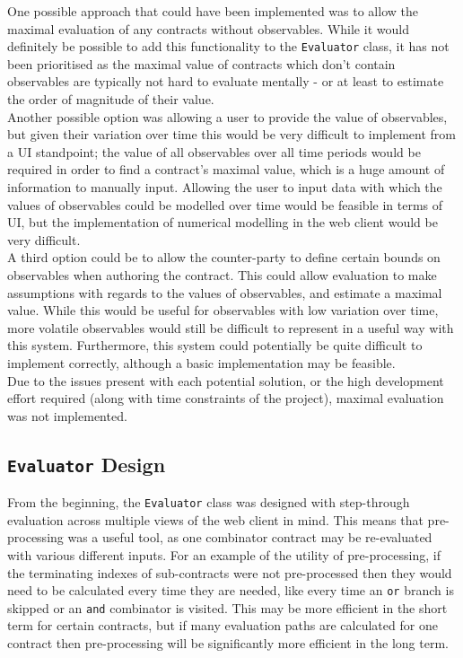One possible approach that could have been implemented was to allow the maximal evaluation of any contracts without observables. While it would definitely be possible to add this functionality to the \texttt{Evaluator} class, it has not been prioritised as the maximal value of contracts which don't contain observables are typically not hard to evaluate mentally - or at least to estimate the order of magnitude of their value. \\

Another possible option was allowing a user to provide the value of observables, but given their variation over time this would be very difficult to implement from a UI standpoint; the value of all observables over all time periods would be required in order to find a contract's maximal value, which is a huge amount of information to manually input. Allowing the user to input data with which the values of observables could be modelled over time would be feasible in terms of UI, but the implementation of numerical modelling in the web client would be very difficult. \\

A third option could be to allow the counter-party to define certain bounds on observables when authoring the contract. This could allow evaluation to make assumptions with regards to the values of observables, and estimate a maximal value. While this would be useful for observables with low variation over time, more volatile observables would still be difficult to represent in a useful way with this system. Furthermore, this system could potentially be quite difficult to implement correctly, although a basic implementation may be feasible. \\

Due to the issues present with each potential solution, or the high development effort required (along with time constraints of the project), maximal evaluation was not implemented.


\subsection{\texttt{Evaluator} Design}

From the beginning, the \texttt{Evaluator} class was designed with step-through evaluation across multiple views of the web client in mind. This means that pre-processing was a useful tool, as one combinator contract may be re-evaluated with various different inputs. For an example of the utility of pre-processing, if the terminating indexes of sub-contracts were not pre-processed then they would need to be calculated every time they are needed, like every time an \texttt{or} branch is skipped or an \texttt{and} combinator is visited. This may be more efficient in the short term for certain contracts, but if many evaluation paths are calculated for one contract then pre-processing will be significantly more efficient in the long term. \\

